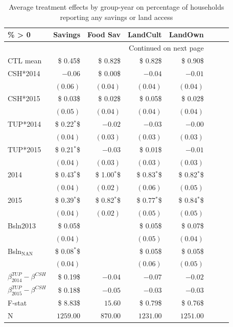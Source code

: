 \documentclass[12pt,article]{article}
\begin{document}
\begin{longtable}{lrrrrrrr}
\caption{\label{tab:Nonzero}Average treatment effects by group-year on percentage of households reporting any savings or land access}
\\
\hline
\% > 0 & Savings & Food Sav & LandCult & LandOwn\\
\hline
\endhead
\hline\multicolumn{5}{r}{Continued on next page} \\
\endfoot
\endlastfoot
CTL mean & \$ 0.45\$ & \$ 0.82\$ & \$ 0.82\$ & \$ 0.90\$\\
\hline
CSH*2014 & $-0.06$ & \$ 0.00\$ & $-0.04$ & $-0.01$\\
 & $( 0.06)$ & $( 0.04)$ & $( 0.04)$ & $( 0.04)$\\
CSH*2015 & \$ 0.03\$ & \$ 0.02\$ & \$ 0.05\$ & \$ 0.02\$\\
 & $( 0.05)$ & $( 0.04)$ & $( 0.04)$ & $( 0.04)$\\
TUP*2014 & \$ 0.22$^{\textbf{*}}$\$ & $-0.02$ & $-0.03$ & $-0.00$\\
 & $( 0.04)$ & $( 0.03)$ & $( 0.03)$ & $( 0.03)$\\
TUP*2015 & \$ 0.21$^{\textbf{*}}$\$ & $-0.03$ & \$ 0.01\$ & $-0.01$\\
 & $( 0.04)$ & $( 0.03)$ & $( 0.03)$ & $( 0.03)$\\
2014 & \$ 0.43$^{\textbf{*}}$\$ & \$ 1.00$^{\textbf{*}}$\$ & \$ 0.83$^{\textbf{*}}$\$ & \$ 0.82$^{\textbf{*}}$\$\\
 & $( 0.04)$ & $( 0.02)$ & $( 0.06)$ & $( 0.05)$\\
2015 & \$ 0.39$^{\textbf{*}}$\$ & \$ 0.82$^{\textbf{*}}$\$ & \$ 0.77$^{\textbf{*}}$\$ & \$ 0.84$^{\textbf{*}}$\$\\
 & $( 0.04)$ & $( 0.02)$ & $( 0.05)$ & $( 0.05)$\\
Bsln2013 & \$ 0.05\$ &  & \$ 0.05\$ & \$ 0.07\$\\
 & $( 0.04)$ &  & $( 0.05)$ & $( 0.04)$\\
Bsln$_{\text{NAN}}$ & \$ 0.08$^{\text{*}}$\$ &  & \$ 0.05\$ & \$ 0.05\$\\
 & $( 0.04)$ &  & $( 0.06)$ & $( 0.05)$\\
\hline
$\beta^{TUP}_{2014}-\beta^{CSH}$ & \$ 0.19\$ & $-0.04$ & $-0.07$ & $-0.02$\\
$\beta^{TUP}_{2015}-\beta^{CSH}$ & \$ 0.18\$ & $-0.05$ & $-0.03$ & $-0.03$\\
\hline
F-stat & \$ 8.83\$ & $15.60$ & \$ 0.79\$ & \$ 0.76\$\\
N & $1259.00$ & $870.00$ & $1231.00$ & $1251.00$\\
\hline
\end{longtable}
\end{document}
